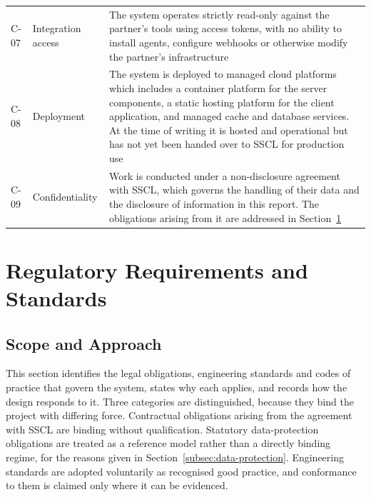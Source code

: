 \begin{longtable}{
  >{\raggedright\arraybackslash}p{}
  >{\raggedright\arraybackslash}p{}
  >{\raggedright\arraybackslash}p{}
}
\addlinespace
C-07 & Integration access & The system operates strictly read-only against the partner's tools using access tokens, with no ability to install agents, configure webhooks or otherwise modify the partner's infrastructure \\
\addlinespace
C-08 & Deployment & The system is deployed to managed cloud platforms which includes a container platform for the server components, a static hosting platform for the client application, and managed cache and database services. At the time of writing it is hosted and operational but has not yet been handed over to SSCL for production use \\
\addlinespace
C-09 & Confidentiality & Work is conducted under a non-disclosure agreement with SSCL, which governs the handling of their data and the disclosure of information in this report. The obligations arising from it are addressed in Section~\ref{sec:standards} \\
\end{longtable}

\section{Regulatory Requirements and Standards}
\label{sec:standards}

\subsection{Scope and Approach}
\label{subsec:standards-approach}

This section identifies the legal obligations, engineering standards and codes of
practice that govern the system, states why each applies, and records how the
design responds to it. Three categories are distinguished, because they bind the
project with differing force. Contractual obligations arising from the agreement
with SSCL are binding without qualification. Statutory data-protection
obligations are treated as a reference model rather than a directly binding
regime, for the reasons given in Section~\ref{subsec:data-protection}. Engineering
standards are adopted voluntarily as recognised good practice, and conformance to
them is claimed only where it can be evidenced.

